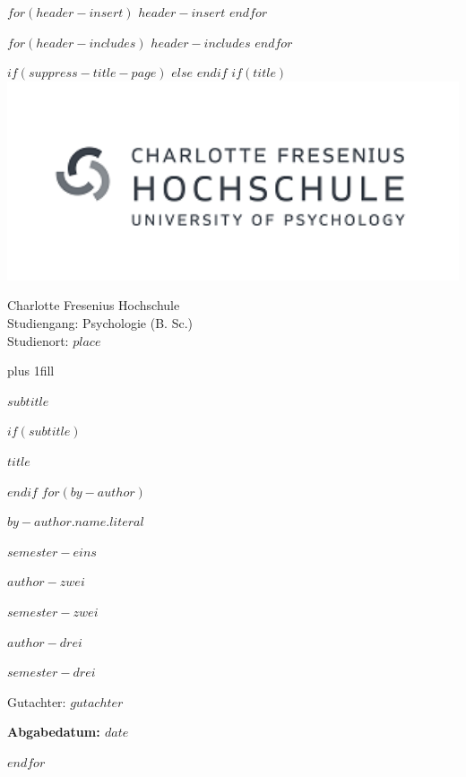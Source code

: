 

$for(header-insert)$
$header-insert$
$endfor$

$for(header-includes)$
$header-includes$
$endfor$

\makeatletter
\xpatchcmd{\appendix}
  {\par}
  {\par}
  {}{}
\makeatother



$if(suppress-title-page)$
$else$
  \frontmatter
$endif$
  $if(title)$
  \cleardoublepage
\thispagestyle{empty}
\hfill \includegraphics[width=20cm]{logo.png}\\
{\centering
  {\large Charlotte Fresenius Hochschule\\
Studiengang: Psychologie (B. Sc.)\\
Studienort: $place$  \par
}
  \hbox{}\vskip 0cm plus 1fill
  {\Large \bfseries $subtitle$ \par}
  $if(subtitle)$
    \vspace{3ex}
  {\Large \bfseries $title$ \par}
  $endif$
    \vfill
  $for(by-author)$
    {\large $by-author.name.literal$ \par}
      \vspace{0ex}
  {$semester-eins$ \par}
  \vspace{0ex}
    {\large $author-zwei$ \par}
  \vspace{0ex}
  {$semester-zwei$ \par}
    \vspace{0ex}
    {\large $author-drei$ \par}
  \vspace{0ex}
  {$semester-drei$ \par}
  \vspace{12ex}
  {\large Gutachter: $gutachter$ \par}
  \vfill
  {\bfseries\large Abgabedatum: $date$ \par}
  \vspace{2ex}
  $endfor$%
  \clearpage
}

